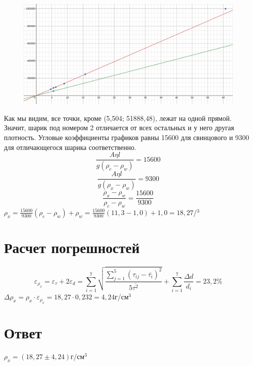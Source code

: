 \documentclass[12pt]{article}
\begin{document}
	\begin{figure}[H]
		\centering
		\includegraphics[width=\linewidth]{graph}
	\end{figure}
	Как мы видим, все точки, кроме (5,504; 51888,48), лежат на одной прямой. Значит, шарик под номером 2 отличается от всех остальных и у него другая плотность. Угловые коэффициенты графиков равны 15600 для свинцового и 9300 для отличающегося шарика соответственно.
	$$\frac{A\eta l}{g(\rho_c-\rho_w)}=15600$$
	$$\frac{A\eta l}{g(\rho_x-\rho_w)}=9300$$
	$$\frac{\rho_x-\rho_w}{\rho_c-\rho_w}=\frac{15600}{9300}$$	
	$\displaystyle\rho_x=\frac{15600}{9300}(\rho_c-\rho_w)+\rho_w=\frac{15600}{9300}(11,3-1,0)+1,0=18,27$\cyrg/\cyrs\cyrm$^3$
	\section{Расчет погрешностей}
	$$\varepsilon_{\rho_x}=\varepsilon_{\tau}+2\varepsilon_{d}=\sum\limits^7_{i=1}\sqrt{\frac{\sum\limits^5_{j=1}(\tau_{ij}-\overline{\tau_i})^2}{5\overline{\tau^2}}}+\sum\limits^7_{i=1}\frac{\Delta d}{d_i}=23,2\%$$
	$\Delta \rho_x=\rho_x\cdot \varepsilon_{\rho_x}=18,27\cdot0,232=4,24$г/см$^3$
	\section{Ответ}
	$\rho_x=(18,27\pm4,24)$г/см$^3$
\end{document}
